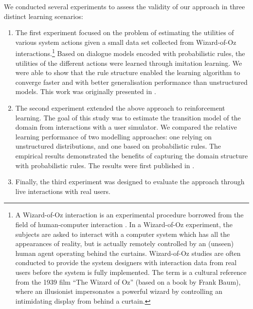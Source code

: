 We conducted several experiments to assess the validity of our approach in three distinct learning scenarios: \begin{enumerate} %
\item The first experiment focused on the problem of estimating the utilities of various system actions given a small data set collected from Wizard-of-Oz interactions.\footnote{A Wizard-of-Oz interaction is an experimental procedure borrowed from the field of human-computer interaction \citep{woz93}. In a Wizard-of-Oz experiment, the subjects are asked to interact with a computer system which has all the appearances of reality, but is actually remotely controlled by an (unseen) human agent operating behind the curtains.  Wizard-of-Oz studies are often conducted to provide the system designers with interaction data from real users before the system is fully implemented.  The term is a cultural reference from the 1939 film ``The Wizard of Oz'' (based on a book by Frank Baum), where an illusionist impersonates a powerful wizard by controlling an intimidating display from behind a curtain.}  Based on dialogue models encoded with probabilistic rules, the utilities of the different actions were learned through imitation learning. We were able to show that the rule structure enabled the learning algorithm to converge faster and with better generalisation performance than unstructured models. This work was originally presented in \citep{rulebasedmodels-sigdial2012}. 
\item The second experiment extended the above approach to reinforcement learning. The goal of this study was to estimate the transition model of the domain from interactions with a user simulator. We compared the relative learning performance of two modelling approaches: one relying on unstructured distributions, and one based on probabilistic rules. The empirical results demonstrated the benefits of capturing the domain structure with probabilistic rules. The results were first published in \citep{interspeech2013}. 
\item Finally, the third experiment was designed to evaluate the approach through live interactions with real users.    \vspace{4cm}
\end{enumerate}

